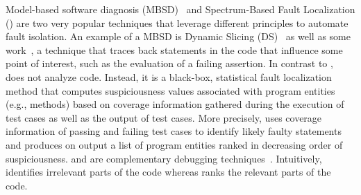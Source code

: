 \documentclass{article}
\begin{document}
Model-based software diagnosis (MBSD)~\cite{REITER198757,DEKLEER200325} and Spectrum-Based Fault Localization
(\sfl{}) are two very popular techniques that leverage different principles
to automate fault isolation. An example of a MBSD is Dynamic
Slicing (DS)~\cite{Agrawal:1990:DPS:93542.93576}
as well as some work~\cite{wotawa2002model,Mayer:2008:EMM:1642931.1642950,mayer2008prioritising,Perez:2018:LQR:3304889.3304927},
a technique that traces back statements in the code that influence some point of interest, such as the evaluation
of a failing assertion. In contrast to \ds{}, \sfl{}~\cite{7390282}
does not analyze code. Instead, it is a black-box, statistical fault
localization method that computes suspiciousness values associated
with program entities (e.g., methods) based on coverage information gathered
during the execution of test cases as well as the
output of test cases. More precisely, \sfl{} uses coverage information
of passing and failing test cases to identify likely faulty
statements and produces on output a list of program entities ranked in
decreasing order of suspiciousness.
\ds{} and \sfl{} are complementary debugging techniques~\cite{DBLP:conf/sac/AbreuGZG08}.
Intuitively, \ds{} identifies irrelevant parts of the code whereas \sfl{}
ranks the relevant parts of the code.


\end{document}
